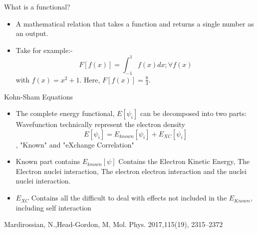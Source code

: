 \documentclass[10pt, aspectratio=169]{beamer}
\begin{document}
\begin{frame}{What is a functional?}
\begin{itemize}
    \item A mathematical relation that takes a function and returns a single number as an output. 
    \item Take for example:-
    \begin{equation}
        F[f(x)] = \int_{-1}^1f(x)dx; \forall f(x)
    \end{equation} with $f(x) = x^2 +1 $. Here, $F[f(x)] = \frac{8}{3}$.
    


\end{itemize}
    
\end{frame}

\begin{frame}{Kohn-Sham Equations}
\begin{itemize}
    \item The complete energy functional, $E[{\psi_i}]$ can be decomposed into two parts: {\scriptsize{Wavefunction technically represent the electron density}}
    \begin{equation}
        E[{\psi_i}] = E_{known}[{\psi_i}] + E_{XC}[{\psi_i}]
    \end{equation}, "Known" and "eXchange Correlation"
    \item Known part contains $E_{known}[{\psi}]$ Contains the Electron Kinetic Energy, The Electron nuclei interaction, The electron electron interaction and the nuclei nuclei interaction.
    \item $E_{XC}$ Contains all the difficult to deal with effects not included in the $E_{Known}$, including self interaction
\end{itemize}
\centering
    \vfill
    \vspace{1cm}
    \scriptsize{Mardirossian, N.,Head-Gordon, M, Mol. Phys. 2017,115(19), 2315–2372}

\end{frame}
\end{document}
